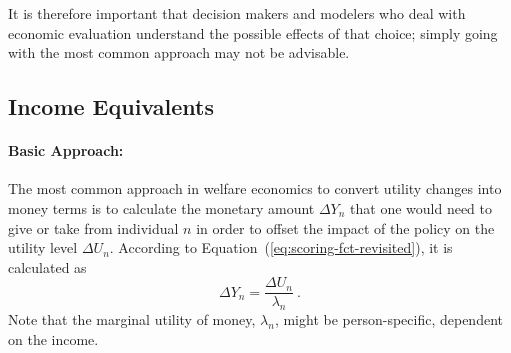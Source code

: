 %
It is therefore important that decision makers and modelers who deal with economic evaluation understand the possible effects of that choice; simply going with the most common approach may not be advisable.
%

\subsection{Income Equivalents}%
\label{ch:economicEval:aggregatingValues:income}%
%
\paragraph*{Basic Approach:}
%
The most common approach in welfare economics to convert utility changes into money terms is to calculate the monetary amount $\Delta Y_n$ that one would need to give or take from individual $n$ in order to offset the impact of the policy on the utility level $\Delta U_n$.
%
According to Equation~(\ref{eq:scoring-fct-revisited}), it is calculated as 
\begin{equation}
\Delta Y_n = \frac{\Delta U_n}{\lambda_n} \ .
\label{eq:ch:economicEval:monetizationWtP}
\end{equation}
%
%
Note that the marginal utility of money, $\lambda_n$, might be person-specific, \eg dependent on the income.


